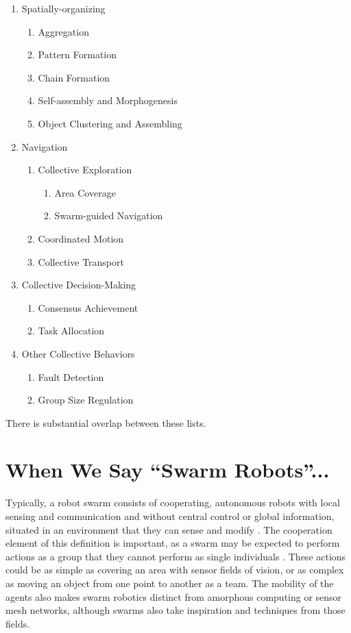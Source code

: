 \documentclass[]{article}
\begin{document}
\begin{enumerate}[noitemsep]
\item Spatially-organizing
	\begin{enumerate}[noitemsep]
	\item Aggregation
	\item Pattern Formation
	\item Chain Formation
	\item Self-assembly and Morphogenesis
	\item Object Clustering and Assembling
	\end{enumerate}
\item Navigation
	\begin{enumerate}[noitemsep]
	\item Collective Exploration
		\begin{enumerate}[noitemsep]
		\item Area Coverage
		\item Swarm-guided Navigation
		\end{enumerate}
	\item Coordinated Motion
	\item Collective Transport
	\end{enumerate}
\item Collective Decision-Making
	\begin{enumerate}[noitemsep]
	\item Consensus Achievement
	\item Task Allocation
	\end{enumerate}
\item Other Collective Behaviors
	\begin{enumerate}[noitemsep]
	\item Fault Detection
	\item Group Size Regulation
	\end{enumerate}
\end{enumerate}

There is substantial overlap between these lists.


\section{When We Say ``Swarm Robots''...}

Typically, a robot swarm consists of cooperating, autonomous robots with local sensing and communication and without central control or global information, situated in an environment that they can sense and modify \cite{brambilla2013swarm}.
The cooperation element of this definition is important, as a swarm may be expected to perform actions as a group that they cannot perform as single individuals \cite{csahin2004swarm}. 
These actions could be as simple as covering an area with sensor fields of vision, or as complex as moving an object from one point to another as a team. 
The mobility of the agents also makes swarm robotics distinct from amorphous computing or sensor mesh networks, although swarms also take inspiration and techniques from those fields.  
\end{document}
